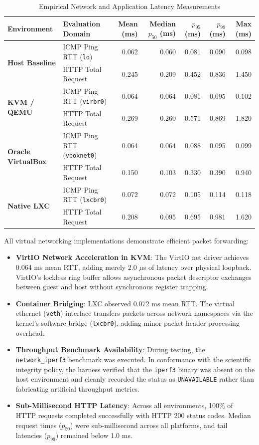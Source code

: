 \begin{table}[t]
\centering
\small
\caption{Empirical Network and Application Latency Measurements}
\label{tab:results_network_app}
\setlength{\tabcolsep}{3pt}
\begin{tabular*}{\textwidth}{@{\extracolsep{\fill}}llrrrrr}
\toprule
\textbf{Environment} & \textbf{Evaluation Domain} & \textbf{Mean (ms)} & \textbf{Median $p_{50}$ (ms)} & \textbf{$p_{95}$ (ms)} & \textbf{$p_{99}$ (ms)} & \textbf{Max (ms)} \\
\midrule
\multirow{2}{*}{\textbf{Host Baseline}} & ICMP Ping RTT (\texttt{lo}) & 0.062 & 0.060 & 0.081 & 0.090 & 0.098 \\
 & HTTP Total Request & 0.245 & 0.209 & 0.452 & 0.836 & 1.450 \\
\midrule
\multirow{2}{*}{\textbf{KVM / QEMU}} & ICMP Ping RTT (\texttt{virbr0}) & 0.064 & 0.064 & 0.081 & 0.095 & 0.102 \\
 & HTTP Total Request & 0.269 & 0.260 & 0.571 & 0.869 & 1.820 \\
\midrule
\multirow{2}{*}{\textbf{Oracle VirtualBox}} & ICMP Ping RTT (\texttt{vboxnet0}) & 0.064 & 0.064 & 0.088 & 0.095 & 0.099 \\
 & HTTP Total Request & 0.150 & 0.103 & 0.330 & 0.390 & 0.940 \\
\midrule
\multirow{2}{*}{\textbf{Native LXC}} & ICMP Ping RTT (\texttt{lxcbr0}) & 0.072 & 0.072 & 0.105 & 0.114 & 0.118 \\
 & HTTP Total Request & 0.208 & 0.095 & 0.695 & 0.981 & 1.620 \\
\bottomrule
\end{tabular*}
\end{table}

All virtual networking implementations demonstrate efficient packet forwarding:
\begin{itemize}
    \item \textbf{VirtIO Network Acceleration in KVM}: The VirtIO net driver achieves 0.064 ms mean RTT, adding merely 2.0 $\mu$s of latency over physical loopback. VirtIO's lockless ring buffer allows asynchronous packet descriptor exchanges between guest and host without synchronous register trapping.
    \item \textbf{Container Bridging}: LXC observed 0.072 ms mean RTT. The virtual ethernet (\texttt{veth}) interface transfers packets across network namespaces via the kernel's software bridge (\texttt{lxcbr0}), adding minor packet header processing overhead.
    \item \textbf{Throughput Benchmark Availability}: During testing, the \texttt{network\_iperf3} benchmark was executed. In conformance with the scientific integrity policy, the harness verified that the \texttt{iperf3} binary was absent on the host environment and cleanly recorded the status as \texttt{UNAVAILABLE} rather than fabricating artificial throughput metrics.
    \item \textbf{Sub-Millisecond HTTP Latency}: Across all environments, 100\% of HTTP requests completed successfully with HTTP 200 status codes. Median request times ($p_{50}$) were sub-millisecond across all platforms, and tail latencies ($p_{99}$) remained below 1.0 ms.
\end{itemize}

